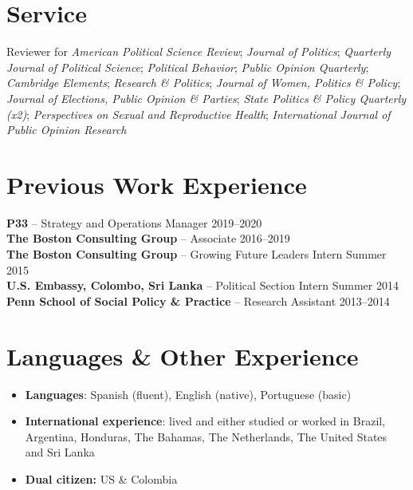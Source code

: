 \documentclass[11pt]{article}
\begin{document}
\section*{Service}
Reviewer for \textit{American Political Science Review}; \textit{Journal of Politics}; \textit{Quarterly Journal of Political Science}; \textit{Political Behavior}; \textit{Public Opinion Quarterly}; \textit{Cambridge Elements}; \textit{Research \& Politics}; \textit{Journal of Women, Politics \& Policy}; \textit{Journal of Elections, Public Opinion \& Parties}; \textit{State Politics \& Policy Quarterly (x2)}; \textit{Perspectives on Sexual and Reproductive Health}; \textit{International Journal of Public Opinion Research}

\section*{Previous Work Experience}
\textbf{P33} -- Strategy and Operations Manager \hfill 2019--2020 \\
\textbf{The Boston Consulting Group} -- Associate \hfill 2016--2019 \\
\textbf{The Boston Consulting Group} -- Growing Future Leaders Intern \hfill Summer 2015 \\
\textbf{U.S. Embassy, Colombo, Sri Lanka} -- Political Section Intern \hfill Summer 2014 \\
\textbf{Penn School of Social Policy \& Practice} -- Research Assistant \hfill 2013--2014

\section*{Languages \& Other Experience}
\begin{itemize}
    \item \textbf{Languages}: Spanish (fluent), English (native), Portuguese (basic)
    \item \textbf{International experience}: lived and either studied or worked in Brazil, Argentina, Honduras, The Bahamas, The Netherlands, The United States and Sri Lanka
    \item \textbf{Dual citizen:} US \& Colombia
\end{itemize}
\end{document}
